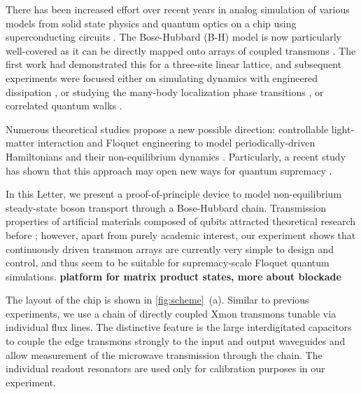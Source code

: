 \documentclass[%
 aps, prl,
 amsmath,amssymb,
 reprint,%
superscriptaddress
]{revtex4-2}
\begin{document}
	\maketitle


There has been increased effort over recent years in analog simulation of various models from solid state physics and quantum optics on a chip using superconducting circuits \cite{kjaergaard2019superconducting}. The Bose-Hubbard (B-H) model is now particularly well-covered as it can be directly mapped onto arrays of coupled transmons \cite{orell2019probing}. The first work \cite{hacohen2015cooling} had demonstrated this for a three-site linear lattice, and subsequent experiments were focused either on simulating dynamics with engineered dissipation \cite{ma2019dissipatively}, or studying the many-body localization phase transitions \cite{roushan2017spectroscopic,chiaro2019growth}, or correlated quantum walks \cite{Yan2019, Ye2019}.

Numerous theoretical studies propose a new possible direction: controllable light-matter interaction and Floquet engineering to model periodically-driven Hamiltonians and their non-equilibrium dynamics \cite{Goldman2014, eisert2015quantum, Zippilli2015, kyriienko2018floquet, franca2020simulating}. Particularly, a recent study has shown that this approach may open new ways for quantum supremacy \cite{tangpanitanon2019quantum}.

In this Letter, we present a proof-of-principle device to model non-equilibrium steady-state boson transport through a Bose-Hubbard chain.  Transmission properties of artificial materials composed of qubits attracted theoretical research before \cite{Zagoskin2016, viehmann2013observing, Greenberg2015, Fistul2019, Biella2015}; however, apart from purely academic interest, our experiment shows that continuously driven transmon arrays are currently very simple to design and control, and thus seem to be suitable for supremacy-scale Floquet quantum simulations. \textbf{platform for matrix product states, more about blockade}

The layout of the chip is shown in \autoref{fig:scheme}~(a). Similar to previous experiments, we use a chain of directly coupled Xmon transmons tunable via individual flux lines. The distinctive feature is the large interdigitated capacitors to couple the edge transmons strongly to the input and output waveguides and allow measurement of the microwave transmission through the chain. The individual readout resonators are used only for calibration purposes in our experiment.
\end{document}
